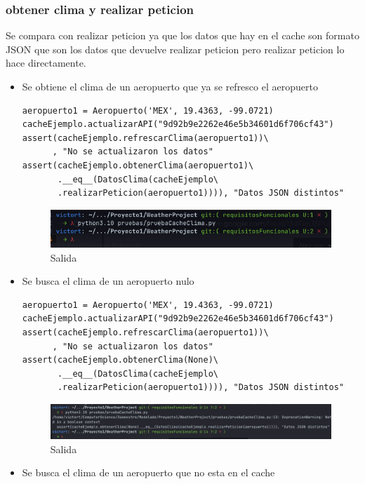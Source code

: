 \documentclass[12pt]{article}
\begin{document}
\subsubsection{obtener clima y realizar peticion}
Se compara con realizar peticion ya que los datos que hay en el cache son formato JSON que son los datos que devuelve realizar peticion pero realizar peticion lo hace directamente.
\begin{itemize}
\item Se obtiene el clima de un aeropuerto que ya se refresco el aeropuerto
\begin{verbatim}
aeropuerto1 = Aeropuerto('MEX', 19.4363, -99.0721)
cacheEjemplo.actualizarAPI("9d92b9e2262e46e5b34601d6f706cf43")
assert(cacheEjemplo.refrescarClima(aeropuerto1))\
      , "No se actualizaron los datos"
assert(cacheEjemplo.obtenerClima(aeropuerto1)\
       .__eq__(DatosClima(cacheEjemplo\
       .realizarPeticion(aeropuerto1)))), "Datos JSON distintos"
\end{verbatim}
 \begin{figure}[h!]
    \centering
    \includegraphics[scale=0.6]{pruebasPy/cache/bien.png}
    \caption{Salida}
  \end{figure}
\item Se busca el clima de un aeropuerto nulo
\begin{verbatim}
aeropuerto1 = Aeropuerto('MEX', 19.4363, -99.0721)
cacheEjemplo.actualizarAPI("9d92b9e2262e46e5b34601d6f706cf43")
assert(cacheEjemplo.refrescarClima(aeropuerto1))\
      , "No se actualizaron los datos"
assert(cacheEjemplo.obtenerClima(None)\
       .__eq__(DatosClima(cacheEjemplo\
       .realizarPeticion(aeropuerto1)))), "Datos JSON distintos"
\end{verbatim}
\begin{figure}[h!]
    \centering
    \includegraphics[scale=0.4]{pruebasPy/cache/obtenNone.png}
    \caption{Salida}
  \end{figure}
\item Se busca el clima de un aeropuerto que no esta en el cache
\begin{verbatim}

\end{verbatim}
\end{itemize}
\end{document}
